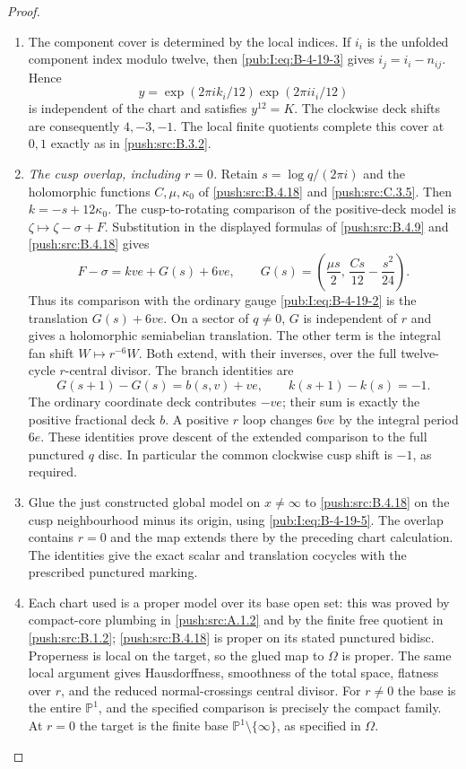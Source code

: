 \begin{proof}
\begin{enumerate}[label=\arabic*.,leftmargin=*]
\item The component cover is determined by the local indices.
If $i_i$ is the
unfolded component index modulo twelve, then
\eqref{pub:I:eq:B-4-19-3} gives $i_j=i_i-n_{ij}$. Hence
\[
 y=\exp(2\pi i k_i/12)\exp(2\pi i i_i/12)
\]
is independent of the chart and satisfies $y^{12}=K$.
The clockwise deck shifts are consequently $4,-3,-1$.
The local finite quotients complete this cover at
$0,1$ exactly as in \ref{push:src:B.3.2}.

\item \emph{The cusp overlap, including $r=0$.}
Retain $s=\log q/(2\pi i)$ and the holomorphic
functions $C,\mu,\kappa_0$ of \ref{push:src:B.4.18} and \ref{push:src:C.3.5}.
Then $k=-s+12\kappa_0$. The cusp-to-rotating comparison of the positive-deck model is
$\zeta\mapsto\zeta-\sigma+F$. Substitution in the
displayed formulas of \ref{push:src:B.4.9} and \ref{push:src:B.4.18} gives
\begin{equation}
 F-\sigma=kve+G(s)+6ve,
 \qquad
 G(s)=\left(\frac{\mu s}{2},\,
                    \frac{Cs}{12}-\frac{s^2}{24}\right).
\label{pub:I:eq:B-4-19-5}
\end{equation}
Thus its comparison with the ordinary gauge
\eqref{pub:I:eq:B-4-19-2} is the translation $G(s)+6ve$.
On a sector of $q\ne0$, $G$ is independent of $r$
and gives a holomorphic semiabelian translation.
The other term is the integral fan shift
$W\mapsto r^{-6}W$. Both extend, with their inverses,
over the full twelve-cycle $r$-central divisor.
The branch identities are
\[
 G(s+1)-G(s)=b(s,v)+ve,
 \qquad k(s+1)-k(s)=-1.
\]
The ordinary coordinate deck contributes $-ve$;
their sum is exactly the positive fractional deck
$b$. A positive $r$ loop changes $6ve$ by the
integral period $6e$. These identities prove
descent of the extended comparison to the full
punctured $q$ disc. In particular the common
clockwise cusp shift is $-1$, as required.

\item Glue the just constructed global model on
$x\ne\infty$ to \ref{push:src:B.4.18} on the cusp neighbourhood
minus its origin, using \eqref{pub:I:eq:B-4-19-5}. The overlap
contains $r=0$ and the map extends there by the
preceding chart calculation. The identities give the exact scalar and translation cocycles
with the prescribed punctured marking.

\item Each chart used is a proper model over its base
open set: this was proved by compact-core plumbing
in \ref{push:src:A.1.2} and by the finite free quotient in \ref{push:src:B.1.2};
\ref{push:src:B.4.18} is proper on its stated punctured bidisc.
Properness is local on the target, so the glued
map to $\Omega$ is proper. The same local argument
gives Hausdorffness, smoothness of the total space,
flatness over $r$, and the reduced normal-crossings
central divisor. For $r\ne0$ the base is the entire
$\mathbb P^1$, and the specified comparison is
precisely the compact family. At $r=0$ the target is the finite base $\mathbb P^1\setminus\{\infty\}$,
as specified in $\Omega$.

\end{enumerate}
\end{proof}